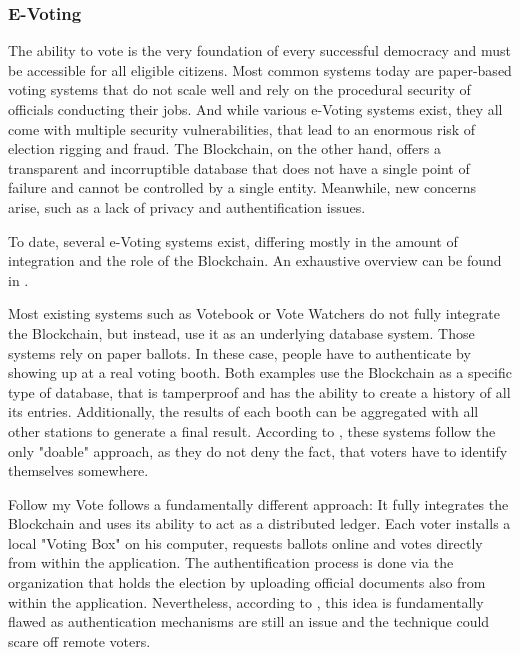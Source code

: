 \subsubsection{E-Voting}
\label{subsec:03_applications_evoting}
The ability to vote is the very foundation of every successful democracy and must be accessible for all eligible citizens. Most common systems today are paper-based voting systems that do not scale well and rely on the procedural security of officials conducting their jobs. And while various e-Voting systems exist, they all come with multiple security vulnerabilities, that lead to an enormous risk of election rigging and fraud.
The Blockchain, on the other hand, offers a transparent and incorruptible database that does not have a single point of failure and cannot be controlled by a single entity. Meanwhile, new concerns arise, such as a lack of privacy and authentification issues.

To date, several e-Voting systems exist, differing mostly in the amount of integration and the role of the Blockchain. An exhaustive overview can be found in  \cite{BenAyed2017}.

Most existing systems such as Votebook \cite{Kirby2016} or Vote Watchers \cite{BlockchainTechnologiesCorporation} do not fully integrate the Blockchain, but instead, use it as an underlying database system. Those systems rely on paper ballots. In these case, people have to authenticate by showing up at a real voting booth. Both examples use the Blockchain as a specific type of database, that is tamperproof and has the ability to create a history of all its entries. Additionally, the results of each booth can be aggregated with all other stations to generate a final result\cite{BenAyed2017}.
According to \cite{Osgood2016}, these systems follow the only "doable" approach, as they do not deny the fact, that voters have to identify themselves somewhere.

Follow my Vote \cite{FollowMyVote} follows a fundamentally different approach: It fully integrates the Blockchain and uses its ability to act as a distributed ledger. Each voter installs a local "Voting Box" on his computer, requests ballots online and votes directly from within the application. The authentification process is done via the organization that holds the election by uploading official documents also from within the application. Nevertheless, according to \cite{Osgood2016}, this idea is fundamentally flawed as authentication mechanisms are still an issue and the technique could scare off remote voters.

